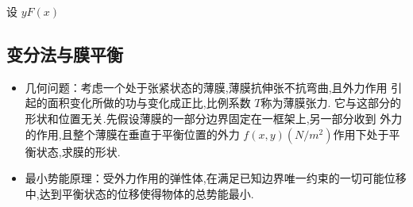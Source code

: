 \documentclass[../../PDE.tex]{subfiles}
\begin{document}
设 \(  y  F\left( x \right)   \)

\subsection{变分法与膜平衡}

\begin{itemize}
    \item 几何问题：考虑一个处于张紧状态的薄膜,薄膜抗伸张不抗弯曲,且外力作用
引起的面积变化所做的功与变化成正比,比例系数 \(  T  \)称为薄膜张力.
它与这部分的形状和位置无关.先假设薄膜的一部分边界固定在一框架上,另一部分收到
外力的作用,且整个薄膜在垂直于平衡位置的外力 \(  f\left( x,y \right)\left( N/ m^{2} \right)    \)作用下处于平衡状态,求膜的形状. 
    \item 最小势能原理：受外力作用的弹性体,在满足已知边界唯一约束的一切可能位移中,达到平衡状态的位移使得物体的总势能最小.
\end{itemize}
\end{document}
